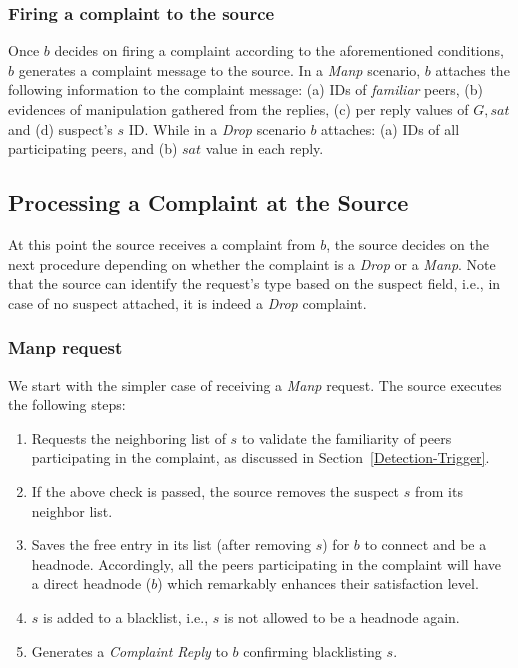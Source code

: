 \subsubsection*{Firing a complaint to the source}

Once $b$ decides on firing a complaint according to the aforementioned conditions, $b$ generates a complaint message to the source.
In a \textit{Manp} scenario, $b$ attaches the following information to the complaint message: (a) IDs of \textit{familiar} peers, (b) evidences of manipulation gathered from the replies, (c) per reply values of $G,sat$ and (d) suspect's $s$ ID.
While in a \textit{Drop} scenario $b$ attaches: (a) IDs of all participating peers, and (b) $sat$ value in each reply.

\subsection{Processing a Complaint at the Source}
\label{complaint_source}
At this point the source receives a complaint from $b$, the source decides on the next procedure depending on whether the complaint is a \textit{Drop} or a \textit{Manp}.
Note that the source can identify the request's type based on the suspect field, i.e., in case of no suspect attached, it is indeed a \textit{Drop} complaint.

\subsubsection*{Manp request}
We start with the simpler case of receiving a \textit{Manp} request. 
The source executes the following steps:
\begin{enumerate}
 \item Requests the neighboring list of $s$ to validate the familiarity of peers participating in the complaint, as discussed in Section~\ref{Detection-Trigger}.
 \item If the above check is passed, the source removes the suspect $s$ from its neighbor list.
 \item Saves the free entry in its list (after removing $s$) for $b$ to connect and be a headnode.
 Accordingly, all the peers participating in the complaint will have a direct headnode ($b$) which remarkably enhances their satisfaction level.
 \item $s$ is added to a blacklist, i.e., $s$ is not allowed to be a headnode again.
 \item Generates a \textit{Complaint Reply} to $b$ confirming blacklisting $s$.
\end{enumerate}


